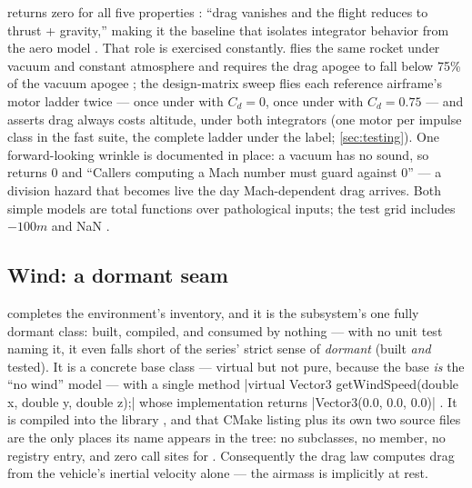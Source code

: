  returns zero for all five properties
: ``drag vanishes and the flight reduces to thrust +
gravity,'' making it the baseline that isolates integrator behavior from the aero model
. That role is exercised constantly.
 flies the same rocket under vacuum and constant
atmosphere and requires the drag apogee to fall below 75\% of the vacuum apogee
; the design-matrix sweep flies each reference
airframe's motor ladder twice --- once under  with $C_d = 0$, once under
 with $C_d = 0.75$ --- and asserts drag always costs altitude,
under both integrators 
 (one motor per impulse class in the fast suite, the
complete ladder under the  label; \cref{sec:testing}). One forward-looking wrinkle is
documented in place: a vacuum has no sound, so  returns 0 and ``Callers
computing a Mach number must guard against 0''  --- a
division hazard that becomes live the day Mach-dependent drag arrives. Both simple models
are total functions over pathological inputs; the test grid includes $-100\unit{m}$ and NaN
.

\subsection{Wind: a dormant seam}\label{sec:environment-wind}

 completes the environment's inventory, and it is the subsystem's one fully
dormant class: built, compiled, and consumed by nothing --- with no unit test naming it, it
even falls short of the series' strict sense of \emph{dormant} (built \emph{and} tested).
It is a concrete base class --- virtual but not pure, because the base \emph{is} the
``no wind'' model --- with a single method
\cppinline|virtual Vector3 getWindSpeed(double x, double y, double z);|
 whose implementation returns
\cppinline|Vector3(0.0, 0.0, 0.0)| . It is compiled into the
 library , and that CMake listing plus its own two
source files are the only places its name appears in the tree: no subclasses, no
 member, no registry entry, and zero call sites for
. Consequently the drag law computes drag from the vehicle's inertial
velocity alone  --- the airmass is implicitly at rest.

